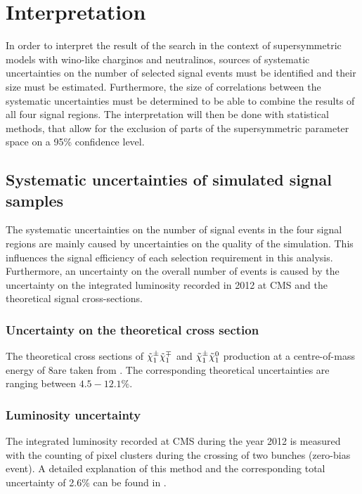 \FloatBarrier
\chapter{Interpretation}
\label{sec:Interpretation}
In order to interpret the result of the search in the context of supersymmetric models with wino-like charginos and neutralinos, sources of systematic uncertainties on the number of selected signal events must be identified
and their size must be estimated.
Furthermore, the size of correlations between the systematic uncertainties must be determined to be able to combine the results of all four signal regions.
The interpretation will then be done with statistical methods, that allow for the exclusion of parts of the supersymmetric parameter space on a 95\% confidence level.

\section{Systematic uncertainties of simulated signal samples}
The systematic uncertainties on the number of signal events in the four signal regions are mainly caused by uncertainties on the quality of the simulation.
This influences the signal efficiency of each selection requirement in this analysis.
Furthermore, an uncertainty on the overall number of events is caused by the uncertainty on the integrated luminosity recorded in 2012 at CMS and the theoretical signal cross-sections.

\subsection*{Uncertainty on the theoretical cross section}
The theoretical cross sections of $\tilde{\chi}^{\pm}_{1}\tilde{\chi}^{\mp}_{1}$ and $\tilde{\chi}^{\pm}_{1}\tilde{\chi}^{0}_{1}$ production at a centre-of-mass energy of 8\tev are taken from \cite{bib:SignalCrossSection_2012,bib:SignalCrossSection_2013}.
The corresponding theoretical uncertainties are ranging between $4.5-12.1\%$.

\subsection*{Luminosity uncertainty}
The integrated luminosity recorded at CMS during the year 2012 is measured with the counting of pixel clusters during the crossing of two bunches (zero-bias event).
A detailed explanation of this method and the corresponding total uncertainty of 2.6\% can be found in \cite{bib:CMS:Lumi_PAS}.

